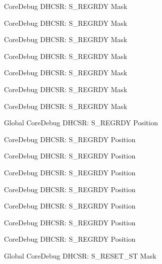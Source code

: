 \begin{DoxyRefList}
\label{deprecated__deprecated000581}%
%
Core\+Debug DHCSR\+: S\+\_\+\+REGRDY Mask 

\label{deprecated__deprecated000120}%
%
Core\+Debug DHCSR\+: S\+\_\+\+REGRDY Mask 

\label{deprecated__deprecated000174}%
%
Core\+Debug DHCSR\+: S\+\_\+\+REGRDY Mask 

\label{deprecated__deprecated000259}%
%
Core\+Debug DHCSR\+: S\+\_\+\+REGRDY Mask 

\label{deprecated__deprecated000479}%
%
Core\+Debug DHCSR\+: S\+\_\+\+REGRDY Mask 

\label{deprecated__deprecated000028}%
%
Core\+Debug DHCSR\+: S\+\_\+\+REGRDY Mask 

\label{deprecated__deprecated000392}%
%
Core\+Debug DHCSR\+: S\+\_\+\+REGRDY Mask  
\item[Global \doxylink{group___c_m_s_i_s___core_debug_ga20a71871ca8768019c51168c70c3f41d}{Core\+Debug\+\_\+\+DHCSR\+\_\+\+S\+\_\+\+REGRDY\+\_\+\+Pos} ]\label{deprecated__deprecated000315}%
%
Core\+Debug DHCSR\+: S\+\_\+\+REGRDY Position 

\label{deprecated__deprecated000119}%
%
Core\+Debug DHCSR\+: S\+\_\+\+REGRDY Position 

\label{deprecated__deprecated000580}%
%
Core\+Debug DHCSR\+: S\+\_\+\+REGRDY Position 

\label{deprecated__deprecated000027}%
%
Core\+Debug DHCSR\+: S\+\_\+\+REGRDY Position 

\label{deprecated__deprecated000478}%
%
Core\+Debug DHCSR\+: S\+\_\+\+REGRDY Position 

\label{deprecated__deprecated000258}%
%
Core\+Debug DHCSR\+: S\+\_\+\+REGRDY Position 

\label{deprecated__deprecated000173}%
%
Core\+Debug DHCSR\+: S\+\_\+\+REGRDY Position 

\label{deprecated__deprecated000391}%
%
Core\+Debug DHCSR\+: S\+\_\+\+REGRDY Position  
\item[Global \doxylink{group___c_m_s_i_s___core_debug_gac474394bcceb31a8e09566c90b3f8922}{Core\+Debug\+\_\+\+DHCSR\+\_\+\+S\+\_\+\+RESET\+\_\+\+ST\+\_\+\+Msk} ]\label{deprecated__deprecated000010}%
%
Core\+Debug DHCSR\+: S\+\_\+\+RESET\+\_\+\+ST Mask 


\end{DoxyRefList}

